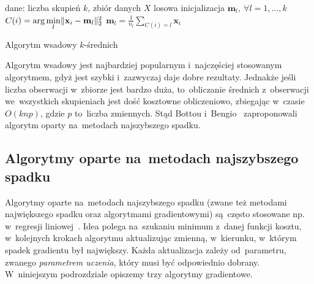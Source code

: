\documentclass{praca1}
\DeclarePairedDelimiter{\norm}{\lVert}{\rVert}
\begin{document}
\begin{algorithm}[!h]
\begin{algorithmic}[1]
		\State dane: liczba skupień $k$, zbiór danych $X$
        \State losowa inicjalizacja $\mathbf{m}_l , \ \forall l=1, \ldots, k$
        \Repeat
                \State $C(i) = \arg \min\limits_{l} \norm{\mathbf{x}_i - \mathbf{m}_l }_2^2 $
            \EndFor
                \State $\mathbf{m}_l = \frac{1}{n_l}\sum\limits_{C(i) = l} \mathbf{x}_i$
            \EndFor

\end{algorithmic}
\caption{Algorytm wsadowy $k$-średnich}\label{alg:001}
\end{algorithm}

Algorytm wsadowy jest najbardziej popularnym i~najczęściej stosowanym algorytmem, gdyż jest szybki i~zazwyczaj daje dobre rezultaty. Jednakże jeśli liczba obserwacji w~zbiorze jest bardzo duża, to~obliczanie średnich z~obserwacji we~wszystkich skupieniach jest dość kosztowne obliczeniowo, zbiegając w~czasie $O(knp)$, gdzie $p$ to~liczba zmiennych. Stąd Bottou i~Bengio~\cite{Bottou1995:convergenceproperties} zaproponowali algorytm oparty na~metodach najszybszego spadku.

\subsection{Algorytmy oparte na~metodach najszybszego spadku}

Algorytmy oparte na~metodach najszybszego spadku (zwane też metodami największego spadku oraz algorytmami gradientowymi) są~często stosowane np. w~regresji liniowej~\cite{Bottou2012:sgdtricks}. Idea polega na~szukaniu minimum z~danej funkcji kosztu, w~kolejnych krokach algorytmu aktualizując zmienną, w~kierunku, w~którym spadek gradientu był największy. Każda aktualizacja zależy od~parametru, zwanego \emph{parametrem uczenia}, który musi być odpowiednio dobrany. W~niniejszym podrozdziale opiszemy trzy algorytmy gradientowe.

\end{document}
